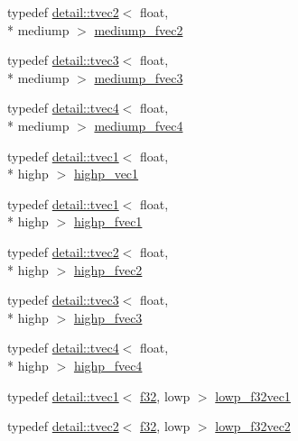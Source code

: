 \begin{DoxyCompactItemize}
\item 
typedef \hyperlink{structglm_1_1detail_1_1tvec2}{detail\-::tvec2}$<$ float, \\*
mediump $>$ \hyperlink{group__gtc__type__precision_ga5c2686caa6838515f6727eea1b64aa05}{mediump\-\_\-fvec2}
\item 
typedef \hyperlink{structglm_1_1detail_1_1tvec3}{detail\-::tvec3}$<$ float, \\*
mediump $>$ \hyperlink{group__gtc__type__precision_ga710c3af5ebb05e5e863cff78affd25a6}{mediump\-\_\-fvec3}
\item 
typedef \hyperlink{structglm_1_1detail_1_1tvec4}{detail\-::tvec4}$<$ float, \\*
mediump $>$ \hyperlink{group__gtc__type__precision_gaba16de142de00531a1598d83716c6939}{mediump\-\_\-fvec4}
\item 
typedef \hyperlink{structglm_1_1detail_1_1tvec1}{detail\-::tvec1}$<$ float, \\*
highp $>$ \hyperlink{group__gtc__type__precision_gab3f08c031846e7a95b49e81c48d920d3}{highp\-\_\-vec1}
\item 
typedef \hyperlink{structglm_1_1detail_1_1tvec1}{detail\-::tvec1}$<$ float, \\*
highp $>$ \hyperlink{group__gtc__type__precision_ga5d9f2208253856df60a57925f92ff0c8}{highp\-\_\-fvec1}
\item 
typedef \hyperlink{structglm_1_1detail_1_1tvec2}{detail\-::tvec2}$<$ float, \\*
highp $>$ \hyperlink{group__gtc__type__precision_gab58ecc53699d45f4f88d67bbff084c54}{highp\-\_\-fvec2}
\item 
typedef \hyperlink{structglm_1_1detail_1_1tvec3}{detail\-::tvec3}$<$ float, \\*
highp $>$ \hyperlink{group__gtc__type__precision_ga79b821fc8ae989b12bb43e2cd3932580}{highp\-\_\-fvec3}
\item 
typedef \hyperlink{structglm_1_1detail_1_1tvec4}{detail\-::tvec4}$<$ float, \\*
highp $>$ \hyperlink{group__gtc__type__precision_gae0de2413648d89bf5a8e598e5520a439}{highp\-\_\-fvec4}
\item 
typedef \hyperlink{structglm_1_1detail_1_1tvec1}{detail\-::tvec1}$<$ \hyperlink{group__gtc__type__precision_ga0ec999b57f5330d9021256e96038df04}{f32}, lowp $>$ \hyperlink{group__gtc__type__precision_gae802918ade0497b72c606430830f5ebb}{lowp\-\_\-f32vec1}
\item 
typedef \hyperlink{structglm_1_1detail_1_1tvec2}{detail\-::tvec2}$<$ \hyperlink{group__gtc__type__precision_ga0ec999b57f5330d9021256e96038df04}{f32}, lowp $>$ \hyperlink{group__gtc__type__precision_ga7faa2c9884c87b1e6512a966adad69e4}{lowp\-\_\-f32vec2}

\end{DoxyCompactItemize}

